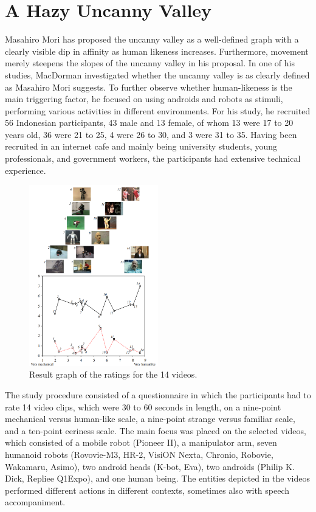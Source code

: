 \section{A Hazy Uncanny Valley}
Masahiro Mori has proposed the uncanny valley as a well-defined graph with a clearly visible dip in affinity as human likeness increases. Furthermore, movement merely steepens the slopes of the uncanny valley in his proposal.
In one of his studies, MacDorman \cite{uncanny_ambiguous} investigated whether the uncanny valley is as clearly defined as Masahiro Mori suggests. To further observe whether human-likeness is the main triggering factor, he focused on using androids and robots as stimuli, performing various activities in different environments. For his study, he recruited 56 Indonesian participants, 43 male and 13 female, of whom 13 were 17 to 20 years old, 36 were 21 to 25, 4 were 26 to 30, and 3 were 31 to 35. Having been recruited in an internet cafe and mainly being university students, young professionals, and government workers, the participants had extensive technical experience.\newpage
\begin{figure} %
    \centering
    \includegraphics[width=0.5\textwidth]{graphics/hazy_uncanny.png}
    \caption{Result graph of the ratings for the 14 videos.}
    \label{fig:hazyUncanny}
\end{figure}
The study procedure consisted of a questionnaire in which the participants had to rate 14 video clips, which were 30 to 60 seconds in length, on a nine-point mechanical versus human-like scale, a nine-point strange versus familiar scale, and a ten-point eeriness scale. The main focus was placed on the selected videos, which consisted of a mobile robot (Pioneer II), a manipulator arm, seven humanoid robots (Rovovie-M3, HR-2, VisiON Nexta, Chronio, Robovie, Wakamaru, Asimo), two android heads (K-bot, Eva), two androids (Philip K. Dick, Repliee Q1Expo), and one human being. The entities depicted in the videos performed different actions in different contexts, sometimes also with speech accompaniment.\\
